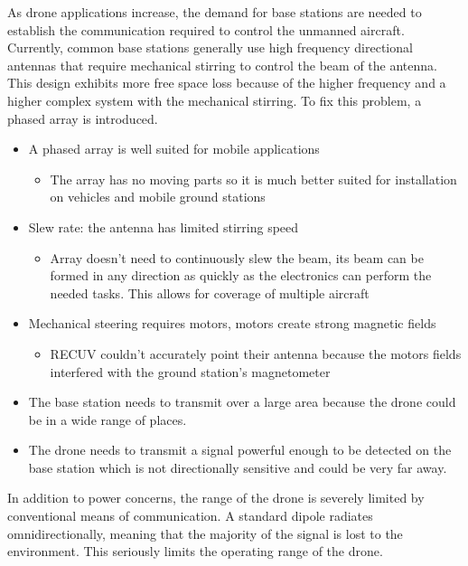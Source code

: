 \documentclass[11pt]{article}
\numberwithin{figure}{section}
\begin{document}
	As drone applications increase, the demand for base stations are needed to establish the communication required to control the unmanned aircraft. Currently, common base stations generally use high frequency directional antennas that require mechanical stirring to control the beam of the antenna. This design exhibits more free space loss because of the higher frequency and a higher complex system with the mechanical stirring. To fix this problem, a phased array is introduced. 
	\begin{itemize}
		\item A phased array is well suited for mobile applications
		\begin{itemize}
			\item The array has no moving parts so it is much better suited for installation on vehicles and mobile ground stations
		\end{itemize}
		\item Slew rate: the antenna has limited stirring speed
		\begin{itemize}
			\item Array doesn’t need to continuously slew the beam, its beam can be formed in any direction as quickly as the electronics can perform the needed tasks. This allows for coverage of multiple aircraft
		\end{itemize}
		\item Mechanical steering requires motors, motors create strong magnetic fields
		\begin{itemize}
			\item RECUV couldn’t accurately point their antenna because the motors fields interfered with the ground station’s magnetometer
		\end{itemize}

		\item The base station needs to transmit over a large area because the drone could be in a wide range of places.
		\item The drone needs to transmit a signal powerful enough to be detected on the base station which is not directionally sensitive and could be very far away.
	\end{itemize}

	
	In addition to power concerns, the range of the drone is severely limited by conventional means of communication.  A standard dipole radiates omnidirectionally, meaning that the majority of the signal is lost to the environment.  This seriously limits the operating range of the drone.  \\
	
\end{document}
